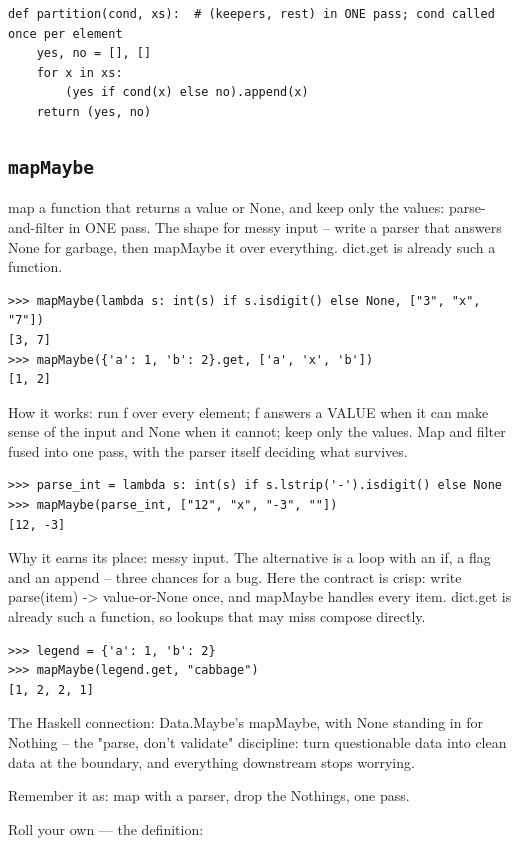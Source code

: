 \documentclass[10pt,letterpaper]{book}
\begin{document}
\begin{lstlisting}[style=ex]
def partition(cond, xs):  # (keepers, rest) in ONE pass; cond called once per element
    yes, no = [], []
    for x in xs:
        (yes if cond(x) else no).append(x)
    return (yes, no)
\end{lstlisting}
\subsection{\texttt{mapMaybe}}\label{def:mapMaybe}
map a function that returns a value or None, and keep only the values: parse-and-filter in ONE pass. The shape for messy input -- write a parser that answers None for garbage, then mapMaybe it over everything. dict.get is already such a function.
\begin{lstlisting}[style=ex]
>>> mapMaybe(lambda s: int(s) if s.isdigit() else None, ["3", "x", "7"])
[3, 7]
>>> mapMaybe({'a': 1, 'b': 2}.get, ['a', 'x', 'b'])
[1, 2]
\end{lstlisting}

How it works: run f over every element; f answers a VALUE when it can make sense of the input and None when it cannot; keep only the values. Map and filter fused into one pass, with the parser itself deciding what survives.

\begin{lstlisting}[style=ex]
>>> parse_int = lambda s: int(s) if s.lstrip('-').isdigit() else None
>>> mapMaybe(parse_int, ["12", "x", "-3", ""])
[12, -3]
\end{lstlisting}

Why it earns its place: messy input. The alternative is a loop with an if, a flag and an append -- three chances for a bug. Here the contract is crisp: write parse(item) -> value-or-None once, and mapMaybe handles every item. dict.get is already such a function, so lookups that may miss compose directly.

\begin{lstlisting}[style=ex]
>>> legend = {'a': 1, 'b': 2}
>>> mapMaybe(legend.get, "cabbage")
[1, 2, 2, 1]
\end{lstlisting}

The Haskell connection: Data.Maybe's mapMaybe, with None standing in for Nothing -- the "parse, don't validate" discipline: turn questionable data into clean data at the boundary, and everything downstream stops worrying.


Remember it as: map with a parser, drop the Nothings, one pass.


Roll your own --- the definition:
\end{document}
